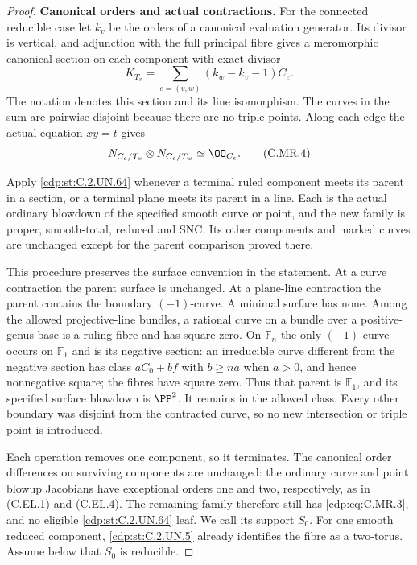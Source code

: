 \begin{proof}
\par\medskip\noindent\textbf{Canonical orders and actual contractions.}
For the connected reducible case let $k_v$ be the orders of
a canonical evaluation generator. Its divisor is vertical,
and adjunction with the full principal fibre gives a
meromorphic canonical section on each component with exact
divisor
\[
 K_{T_v}=
       \sum_{e=(v,w)}(k_w-k_v-1)C_e.
\tag{C.MR.3}\label{cdp:eq:C.MR.3}
\]
The notation denotes this section and its line isomorphism.
The curves in the sum are pairwise disjoint because there
are no triple points. Along each edge the actual equation
$xy=t$ gives
\[
                 N_{C_e/T_v}\otimes N_{C_e/T_w}
                                        \simeq\OO_{C_e}.
\tag{C.MR.4}\label{cdp:eq:C.MR.4}
\]

Apply \ref{cdp:st:C.2.UN.64} whenever a terminal ruled component meets its
parent in a section, or a terminal plane meets its parent
in a line. Each is the actual ordinary blowdown of the
specified smooth curve or point, and the new family is
proper, smooth-total, reduced and SNC. Its other components
and marked curves are unchanged except for the parent
comparison proved there.

This procedure preserves the surface convention in the
statement. At a curve contraction the parent surface is
unchanged. At a plane-line contraction the parent contains
the boundary $(-1)$-curve. A minimal surface has none.
Among the allowed projective-line bundles, a rational
curve on a bundle over a positive-genus base is a ruling
fibre and has square zero. On $\mathbb F_n$ the only
$(-1)$-curve occurs on $\mathbb F_1$ and is its negative
section: an irreducible curve different from the negative
section has class $aC_0+bf$ with $b\ge na$ when $a>0$,
and hence nonnegative square; the fibres have square zero.
Thus that parent is $\mathbb F_1$, and its specified
surface blowdown is $\PP^2$. It remains in the allowed
class. Every other boundary was disjoint from the
contracted curve, so no new intersection or triple point
is introduced.

Each operation removes one component, so it terminates.
The canonical order differences on surviving components
are unchanged: the ordinary curve and point blowup
Jacobians have exceptional orders one and two,
respectively, as in (C.EL.1) and (C.EL.4). The remaining
family therefore still has \eqref{cdp:eq:C.MR.3}, and no eligible
\ref{cdp:st:C.2.UN.64} leaf. We call its support $S_0$.
For one smooth reduced component, \ref{cdp:st:C.2.UN.5} already identifies
the fibre as a two-torus. Assume below that $S_0$ is
reducible.


\end{proof}
